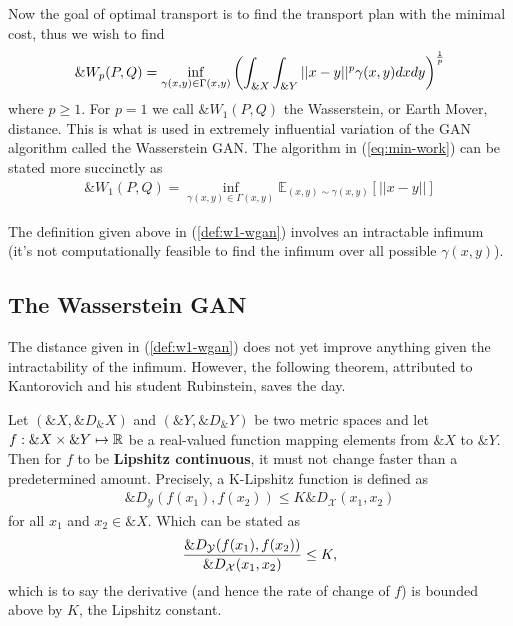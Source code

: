 Now the goal of optimal transport is to find the transport plan with
the minimal cost, thus we wish to find
\begin{align}
  \label{eq:min-work}
  \&W_p(P, Q) = \inf_{\gamma(x,y) \in \Gamma(x,y)} \left( \int_{\&X}\int_{\&Y}||x-y||^p\gamma(x, y)dxdy \right)^{1 \over p}
\end{align}
where $p \geq 1$. For $p=1$ we call $\&W_1(P, Q)$ the Wasserstein, or
Earth Mover, distance. This is what is used in extremely influential
variation of the GAN algorithm called the Wasserstein GAN. The
algorithm in (\ref{eq:min-work}) can be stated more succinctly as
\begin{align}
  \label{def:w1-wgan}
  \&W_1(P, Q) = \inf_{\gamma(x, y) \in \Gamma(x,y)}\mathbb{E}_{(x,y) \sim \gamma(x, y)} \left[ || x-y || \right]
\end{align}
\begin{remark}
  The definition given above in (\ref{def:w1-wgan}) involves an
  intractable infimum (it's not computationally feasible to find the
  infimum over all possible $\gamma(x, y)$).
\end{remark}

\subsection{The Wasserstein GAN}

The distance given in (\ref{def:w1-wgan}) does not yet improve
anything given the intractability of the infimum. However, the
following theorem, attributed to Kantorovich and his student
Rubinstein, saves the day.

\begin{definition}
  Let $(\&X, \&D_\&X)$ and $(\&Y, \&D_\&Y)$ be two metric spaces and
  let $f: \&X \times \&Y \mapsto \mathbb{R}$ be a real-valued function mapping
  elements from $\&X$ to $\&Y$. Then for $f$ to be \textbf{Lipshitz
    continuous}, it must not change faster than a predetermined
  amount.  Precisely, a K-Lipshitz function is defined as
  \begin{align}
    \&D_{\mathcal{Y}}(f(x_1), f(x_2)) \leq K{\&D}_{\mathcal{X}}(x_1, x_2)
  \end{align}
  for all $x_1$ and $x_2 \in \&X$. Which can be stated as
  \begin{align}
    {\&D_{\mathcal{Y}}(f(x_1), f(x_2)) \over \&D_{\mathcal{X}}(x_1, x_2)} \leq K,
  \end{align}
  which is to say the derivative (and hence the rate of change of $f$)
  is bounded above by $K$, the Lipshitz constant.
\end{definition}

